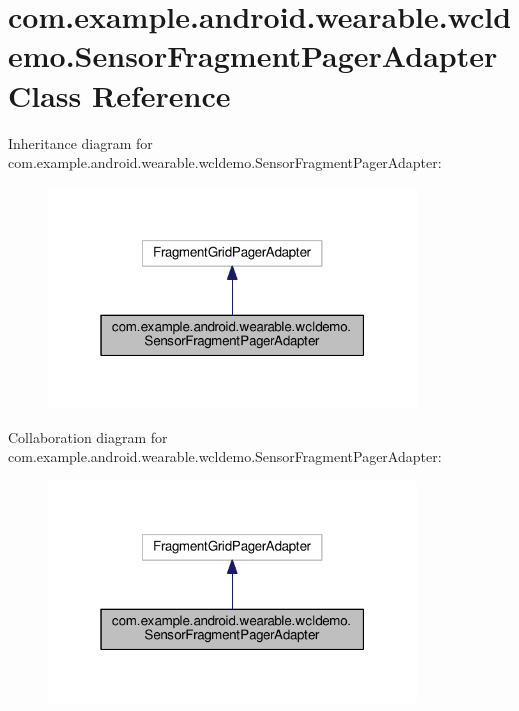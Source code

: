 \hypertarget{classcom_1_1example_1_1android_1_1wearable_1_1wcldemo_1_1SensorFragmentPagerAdapter}{}\section{com.\+example.\+android.\+wearable.\+wcldemo.\+Sensor\+Fragment\+Pager\+Adapter Class Reference}
\label{classcom_1_1example_1_1android_1_1wearable_1_1wcldemo_1_1SensorFragmentPagerAdapter}


Inheritance diagram for com.\+example.\+android.\+wearable.\+wcldemo.\+Sensor\+Fragment\+Pager\+Adapter\+:
\nopagebreak
\begin{figure}[H]
\begin{center}
\leavevmode
\includegraphics[width=277pt]{d2/d0d/classcom_1_1example_1_1android_1_1wearable_1_1wcldemo_1_1SensorFragmentPagerAdapter__inherit__graph}
\end{center}
\end{figure}


Collaboration diagram for com.\+example.\+android.\+wearable.\+wcldemo.\+Sensor\+Fragment\+Pager\+Adapter\+:
\nopagebreak
\begin{figure}[H]
\begin{center}
\leavevmode
\includegraphics[width=277pt]{dd/d8a/classcom_1_1example_1_1android_1_1wearable_1_1wcldemo_1_1SensorFragmentPagerAdapter__coll__graph}
\end{center}
\end{figure}
